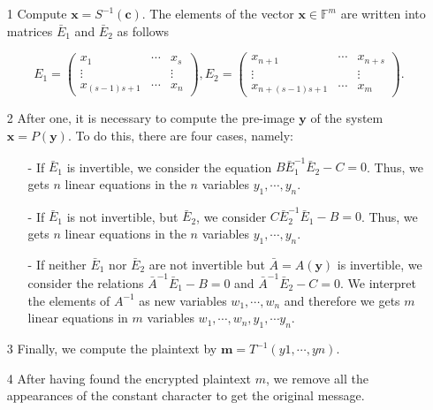 \begin{itemize}
\item[1] Compute $\boldsymbol x=S^{-1}(\boldsymbol c)$. The elements of the vector $\boldsymbol x\in \mathbb{F}^m$ are written into matrices $\bar{E}_1$ and $\bar{E}_2$ as follows 

\begin{equation}
 E_1=\left(\begin{matrix}
    x_1 & \cdots & x_s\\
    \vdots & & \vdots \\
    x_{(s-1)s+1} & \cdots & x_n 
   \end{matrix}\right), 
    E_2=\left(\begin{matrix}
    x_{n+1} & \cdots & x_{n+s}\\
    \vdots & & \vdots \\
    x_{n+(s-1)s+1} & \cdots & x_m 
   \end{matrix}\right).
\label{eq:2}
\end{equation}
\item[2] After one, it is necessary to compute the pre-image $\boldsymbol y$ of the system $\boldsymbol x=P(\boldsymbol y)$. To do this, there are four cases, namely:
\begin{itemize}
\item[-] If $\bar{E}_1$ is invertible, we consider the equation $B\bar{E}_1^{-1}\bar{E}_2-C=0$. Thus, we gets $n$ linear equations in the $n$ variables $y_1, \cdots, y_n$.
\item[-] If $\bar{E}_1$ is not invertible, but  $\bar{E}_2$, we consider $C\bar{E}_2^{-1}\bar{E}_1-B=0$. Thus, we gets $n$ linear equations in the $n$ variables $y_1, \cdots, y_n$.
\item[-] If neither $\bar{E}_1$ nor $\bar{E}_2$ are not invertible but $\bar{A}=A(\boldsymbol y)$ is invertible, we consider the relations $\bar{A}^{-1}\bar{E}_1-B=0$ and $\bar{A}^{-1}\bar{E}_2-C=0$. We interpret the elements of $A^{-1}$ as new variables $w_1, \cdots, w_n$ and therefore we gets $m$ linear equations in $m$ variables $w_1, \cdots, w_n, y_1, \cdots y_n$.
\end{itemize}
\item[3] Finally, we compute the plaintext by $\boldsymbol m = T^{-1}(y1, \cdots , yn)$. 
\item[4] After having found the encrypted plaintext $m$, we remove all the appearances of
the constant character to get the original message.
\end{itemize} 
